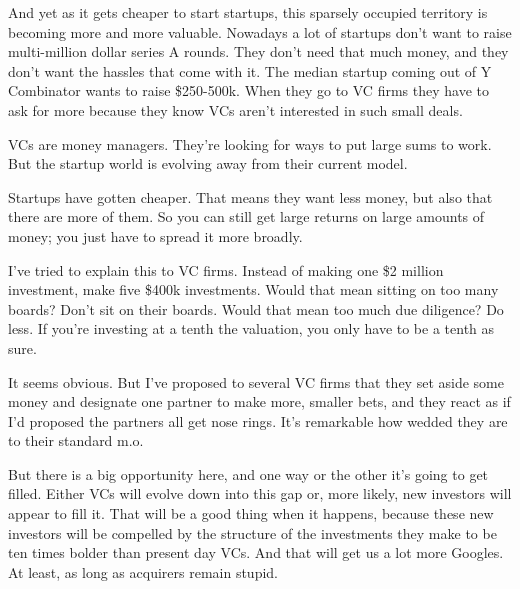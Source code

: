 And
                  yet as it gets cheaper to start startups, this sparsely
                  occupied territory is becoming more and more valuable.
                  Nowadays a lot of startups don't want to raise multi-million
                  dollar series A rounds. They don't need that much money, and
                  they don't want the hassles that come with it. The median
                  startup coming out of Y Combinator wants to raise \$250-500k.
                  When they go to VC firms they have to ask for more because
                  they know VCs aren't interested in such small deals.

VCs
                  are money managers. They're looking for ways to put large sums
                  to work. But the startup world is evolving away from their
                  current model.

Startups have gotten cheaper. That
                  means they want less money, but also that there are more of
                  them. So you can still get large returns on large amounts of
                  money; you just have to spread it more broadly.

I've
                  tried to explain this to VC firms. Instead of making one \$2
                  million investment, make five \$400k investments. Would that
                  mean sitting on too many boards? Don't sit on their boards.
                  Would that mean too much due diligence? Do less. If you're
                  investing at a tenth the valuation, you only have to be a
                  tenth as sure.

It seems obvious. But I've proposed
                  to several VC firms that they set aside some money and
                  designate one partner to make more, smaller bets, and they
                  react as if I'd proposed the partners all get nose rings. It's
                  remarkable how wedded they are to their standard m.o.

But
                  there is a big opportunity here, and one way or the other it's
                  going to get filled. Either VCs will evolve down into this gap
                  or, more likely, new investors will appear to fill it. That
                  will be a good thing when it happens, because these new
                  investors will be compelled by the structure of the
                  investments they make to be ten times bolder than present day
                  VCs. And that will get us a lot more Googles. At least, as
                  long as acquirers remain stupid.






